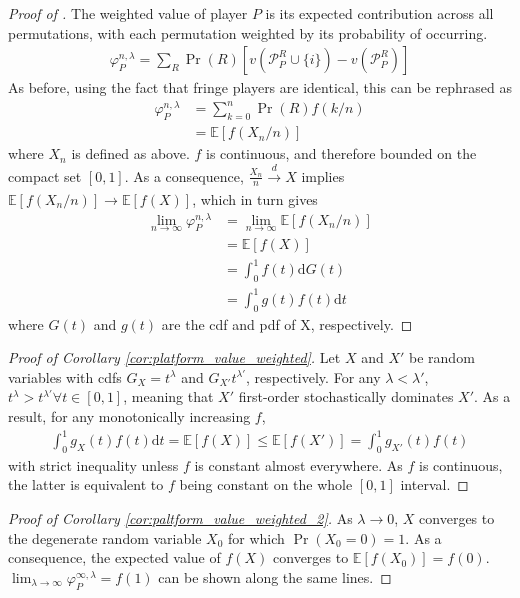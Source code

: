 \documentclass[a4paper]{article}
\newcommand{\dt}{\mathrm{d}t}
\newcommand{\dG}{\mathrm{d}G}
\newcommand{\E}{\mathbb{E}}
\begin{document}
\begin{proof}[Proof of ]
    The weighted value of player $P$ is its expected contribution across all permutations, with each permutation weighted by its probability of occurring.
    \begin{align*}
        \varphi_P^{n, \lambda} = \sum_R \Pr(R) [v(\mathcal{P}_P^R \cup \{i\}) - v(\mathcal{P}_P^R)]
    \end{align*}
    As before, using the fact that fringe players are identical, this can be rephrased as
    \begin{align*}
        \varphi_P^{n, \lambda} &= \sum_{k=0}^n \Pr(R) f(k/n) \\
        &= \E[f(X_n / n)]
    \end{align*}
    where $X_n$ is defined as above.
    $f$ is continuous, and therefore bounded on the compact set $[0, 1]$.
    As a consequence, $\frac{X_n}{n} \xrightarrow[]{d} X$ implies $\E[f(X_n / n)] \to \E[f(X)]$, which in turn gives
    \begin{align*}
        \lim_{n \to \infty} \varphi_P^{n, \lambda} &= \lim_{n \to \infty} \E[f(X_n / n)] \\
        &= \E[f(X)] \\
        &= \int_0^1 f(t) \dG(t) \\
        &= \int_0^1 g(t)f(t) \dt
    \end{align*}
    where $G(t)$ and $g(t)$ are the cdf and pdf of X, respectively.
\end{proof}

\begin{proof}[Proof of Corollary \ref{cor:platform_value_weighted}]
    Let $X$ and $X'$ be random variables with cdfs $G_X = t^\lambda$ and $G_{X'}t^{\lambda'}$, respectively.
    For any $\lambda < \lambda'$, $t^\lambda > t^{\lambda'} \forall t \in [0, 1]$, meaning that $X'$ first-order stochastically dominates $X'$.
    As a result, for any monotonically increasing $f$,
    \begin{align*}
        \int_0^1 g_X(t)f(t) \dt = \E[f(X)] \leq \E[f(X')] = \int_0^1 g_{X'}(t)f(t)
    \end{align*}
    with strict inequality unless $f$ is constant almost everywhere.
    As $f$ is continuous, the latter is equivalent to $f$ being constant on the whole $[0, 1]$ interval.
\end{proof}

\begin{proof}[Proof of Corollary \ref{cor:paltform_value_weighted_2}]
    As $\lambda \to 0$, $X$ converges to the degenerate random variable $X_0$ for which $\Pr(X_0 = 0) = 1$.
    As a consequence, the expected value of $f(X)$ converges to $\E[f(X_0)] = f(0)$.
    $\lim_{\lambda \to \infty} \varphi^{\infty, \lambda}_P = f(1)$ can be shown along the same lines.
\end{proof}
\end{document}

